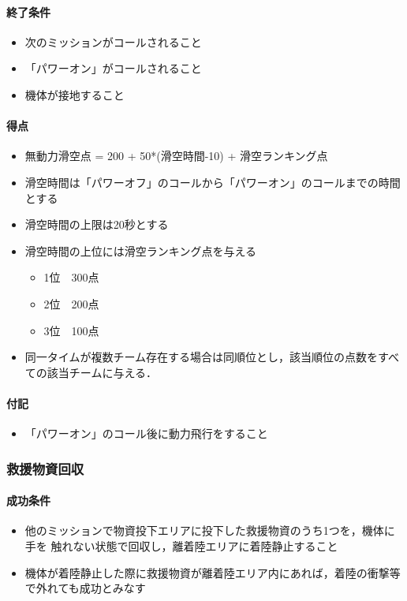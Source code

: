\paragraph{終了条件}
\begin{itemize}
\item 次のミッションがコールされること
\item 「パワーオン」がコールされること
\item 機体が接地すること
\end{itemize}
\paragraph{得点}
\begin{itemize}
\item 無動力滑空点 = 200 + 50*(滑空時間-10) + 滑空ランキング点
\item 滑空時間は「パワーオフ」のコールから「パワーオン」のコールまでの時間とする
\item 滑空時間の上限は20秒とする
\item 滑空時間の上位には滑空ランキング点を与える
\begin{itemize}
  \item 1位　300点
  \item 2位　200点
  \item 3位　100点
\end{itemize}
\item 同一タイムが複数チーム存在する場合は同順位とし，該当順位の点数をすべての該当チームに与える．
\end{itemize}
\paragraph{付記}
\begin{itemize}
\item 「パワーオン」のコール後に動力飛行をすること
\end{itemize}

\subsubsection{救援物資回収}
\paragraph{成功条件}
\begin{itemize}
\item 他のミッションで物資投下エリアに投下した救援物資のうち1つを，機体に手を
触れない状態で回収し，離着陸エリアに着陸静止すること
  \item 機体が着陸静止した際に救援物資が離着陸エリア内にあれば，着陸の衝撃等で外れても成功とみなす
\end{itemize}
